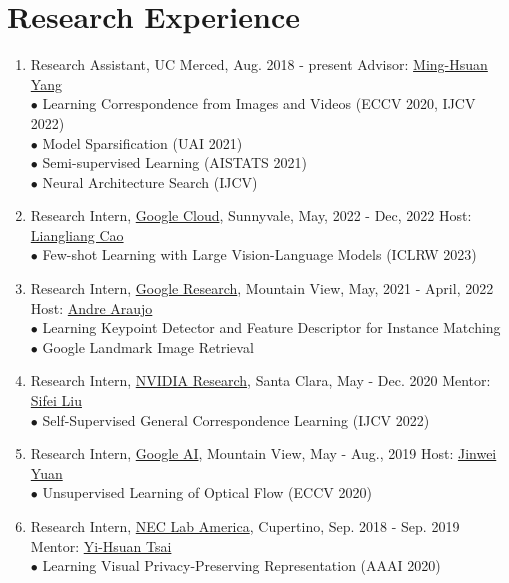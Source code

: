 \documentclass[letterpaper]{article}
\begin{document}
\iffalse
\section*{Research Experience} 

\begin{enumerate}

\item Research Assistant, UC Merced, Aug. 2018 - present \hfill Advisor: \href{http://faculty.ucmerced.edu/mhyang/}{Ming-Hsuan Yang}\\
	$\bullet$ Learning Correspondence from Images and Videos (ECCV 2020, IJCV 2022) \\
	$\bullet$ Model Sparsification (UAI 2021) \\
	$\bullet$ Semi-supervised Learning (AISTATS 2021) \\
	$\bullet$ Neural Architecture Search (IJCV)
	
\item Research Intern, \href{https://cloud.google.com/products/ai}{Google Cloud}, Sunnyvale, May, 2022 - Dec, 2022 \hfill Host: \href{http://llcao.net/}{Liangliang Cao} \\
	$\bullet$ Few-shot Learning with Large Vision-Language Models (ICLRW 2023)

\item Research Intern, \href{https://research.google}{Google Research}, Mountain View, May, 2021 - April, 2022 \hfill Host: \href{https://andrefaraujo.github.io/}{Andre Araujo} \\
	$\bullet$ Learning Keypoint Detector and Feature Descriptor for Instance Matching \\
	$\bullet$ Google Landmark Image Retrieval
	
\item Research Intern, \href{https://www.nvidia.com/en-us/research/}{NVIDIA Research}, Santa Clara, May - Dec. 2020 \hfill Mentor: \href{https://www.sifeiliu.net/}{Sifei Liu}\\
	$\bullet$ Self-Supervised General Correspondence Learning (IJCV 2022)

\item Research Intern, \href{https://ai.google/}{Google AI}, Mountain View, May - Aug., 2019 \hfill Host: \href{mailto:jinwei@google.com}{Jinwei Yuan}\\
	$\bullet$ Unsupervised Learning of Optical Flow (ECCV 2020)

\item Research Intern, \href{https://www.nec-labs.com//}{NEC Lab America}, Cupertino, Sep. 2018 - Sep. 2019 \hfill Mentor: \href{https://sites.google.com/site/yihsuantsai/}{Yi-Hsuan Tsai} \\
 	$\bullet$ Learning Visual Privacy-Preserving Representation (AAAI 2020)


\end{enumerate}
\end{document}
